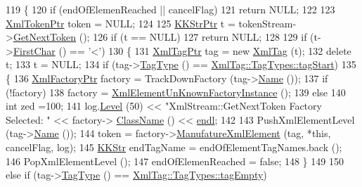 \begin{DoxyCode}
119 \{
120   \textcolor{keywordflow}{if}  (endOfElemenReached  || cancelFlag)
121     \textcolor{keywordflow}{return} NULL;
122 
123   \hyperlink{class_k_k_b_1_1_xml_token}{XmlTokenPtr}  token = NULL;
124 
125   \hyperlink{class_k_k_b_1_1_k_k_str}{KKStrPtr}   t = tokenStream->\hyperlink{class_k_k_b_1_1_xml_tokenizer_a7214f4cd0fc6026fe5fe827ba7ad1f2f}{GetNextToken} ();
126   \textcolor{keywordflow}{if}  (t == NULL)
127     \textcolor{keywordflow}{return} NULL;
128 
129   \textcolor{keywordflow}{if}  (t->\hyperlink{class_k_k_b_1_1_k_k_str_ac20e69c629b985c6569af914d9cc3e8c}{FirstChar} () == \textcolor{charliteral}{'<'})
130   \{
131     \hyperlink{class_k_k_b_1_1_xml_tag}{XmlTagPtr}  tag = \textcolor{keyword}{new} \hyperlink{class_k_k_b_1_1_xml_tag}{XmlTag} (t);
132     \textcolor{keyword}{delete}  t;
133     t = NULL;
134     \textcolor{keywordflow}{if}  (tag->\hyperlink{class_k_k_b_1_1_xml_tag_abe56f7d7b736e627d3a9a584ff965b1e}{TagType} () == \hyperlink{class_k_k_b_1_1_xml_tag_a6c0ef0e23f982f49d55d4fb7eaff6ac9ab02b23b5e15b3a1353771313e1176ce0}{XmlTag::TagTypes::tagStart})
135     \{
136       \hyperlink{class_k_k_b_1_1_xml_factory}{XmlFactoryPtr}  factory = TrackDownFactory (tag->\hyperlink{class_k_k_b_1_1_xml_tag_a80934a69d86c1e06b13889fcde99a63b}{Name} ());
137       \textcolor{keywordflow}{if}  (!factory)
138         factory = \hyperlink{namespace_k_k_b_a064ced683cbf54b5cc186bdadd9bda14}{XmlElementUnKnownFactoryInstance}  ();
139       \textcolor{keywordflow}{else}
140         \textcolor{keywordtype}{int} zed =100;
141       log.\hyperlink{class_k_k_b_1_1_run_log_a32cf761d7f2e747465fd80533fdbb659}{Level} (50) << \textcolor{stringliteral}{"XmlStream::GetNextToken   Factory Selected: "} << factory->
      \hyperlink{class_k_k_b_1_1_xml_factory_a32733484cc01e731d559a91cde0ad252}{ClassName} () << \hyperlink{namespace_k_k_b_ad1f50f65af6adc8fa9e6f62d007818a8}{endl};
142 
143       PushXmlElementLevel (tag->\hyperlink{class_k_k_b_1_1_xml_tag_a80934a69d86c1e06b13889fcde99a63b}{Name} ());
144       token = factory->\hyperlink{class_k_k_b_1_1_xml_factory_a3f4b4f19dee1905e1758b16c66d0112a}{ManufatureXmlElement} (tag, *\textcolor{keyword}{this}, cancelFlag, log);
145       \hyperlink{class_k_k_b_1_1_k_k_str}{KKStr}  endTagName = endOfElementTagNames.back ();
146       PopXmlElementLevel ();
147       endOfElemenReached = \textcolor{keyword}{false};
148     \}
149 
150     \textcolor{keywordflow}{else} \textcolor{keywordflow}{if}  (tag->\hyperlink{class_k_k_b_1_1_xml_tag_abe56f7d7b736e627d3a9a584ff965b1e}{TagType} () == \hyperlink{class_k_k_b_1_1_xml_tag_a6c0ef0e23f982f49d55d4fb7eaff6ac9ac842083d30a90700e09f4cbf728f01b8}{XmlTag::TagTypes::tagEmpty})

\end{DoxyCode}
